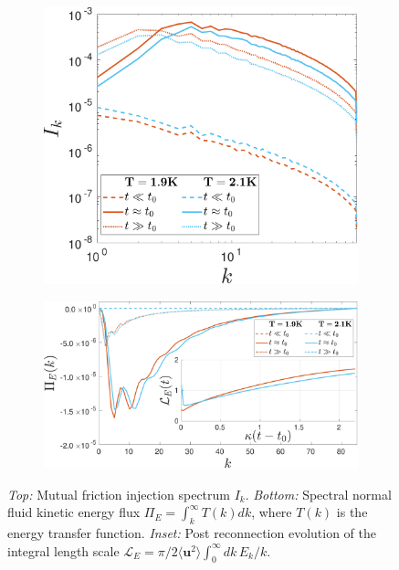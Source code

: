\documentclass[%
 reprint,
 amsmath,amssymb,
 aps,
 prl,
]{revtex4-2}
\begin{document}
\begin{figure}
    \centering
    \begin{subfigure}[b]{0.49\textwidth}
        \centering
        \includegraphics*[width=\textwidth]{inj-spec.pdf}
        \caption{}
    \end{subfigure}

    \begin{subfigure}[b]{0.49\textwidth}
    \centering
    \includegraphics*[width=\textwidth]{flux-spec.pdf}
    \caption{}
    \end{subfigure}
\hfill

\caption{\emph{Top:} Mutual friction injection spectrum $I_k$. \emph{Bottom:} Spectral normal fluid kinetic energy flux $\Pi_E=\int_k^{\infty}T(k)dk$, where $T(k)$ is the energy transfer function. \emph{Inset:} Post reconnection evolution of the integral length scale $\mathcal{L}_E=\pi/2\langle\mathbf{u}^2\rangle\int_0^{\infty}dk\,E_k/k$.}
\end{figure}
\end{document}
